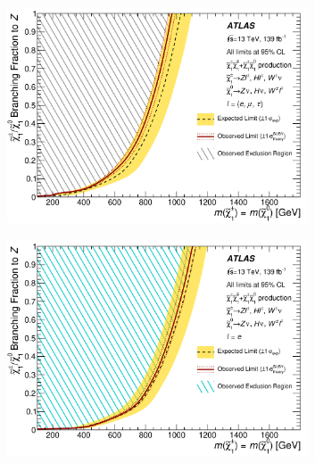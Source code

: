\begin{figure}
    \centering
    \begin{subfigure}[b]{0.49\textwidth}
      \centering
      \includegraphics[width=0.98\textwidth]{figs/rpvthreel/contours_bre_33_brm_33_brt_33_Nominal.png}
      \caption{}
      \label{fig:contour_democratic}
    \end{subfigure}
    \hfill
    \begin{subfigure}[b]{0.49\textwidth}
      \centering
      \includegraphics[width=0.98\textwidth]{figs/rpvthreel/contours_bre_100_brm_0_brt_0_Nominal.png}
      \caption{}
      \label{fig:contour_100e}
    \end{subfigure}
    \hfill
    \begin{subfigure}[b]{0.49\textwidth}
      \centering

\end{subfigure}
\end{figure}
